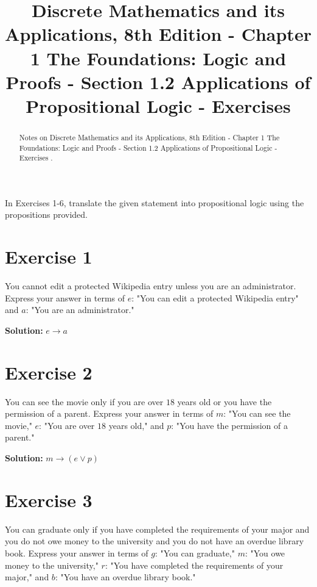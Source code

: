 \documentclass{Axon}
\title{Discrete Mathematics and its Applications, 8th Edition - Chapter 1 The Foundations: Logic and Proofs - Section 1.2 Applications of Propositional Logic - Exercises}
\begin{document}
\maketitle
\makeauthor
\begin{abstract}
Notes on Discrete Mathematics and its Applications, 8th Edition - Chapter 1 The Foundations: Logic and Proofs - Section 1.2 Applications of Propositional Logic - Exercises \cite{Rosen}.
\end{abstract}
\section*{}
In Exercises 1-6, translate the given statement into propositional logic using the propositions provided.

\section*{Exercise 1}
You cannot edit a protected Wikipedia entry unless you are an administrator. Express your answer in terms of \(e\): "You can edit a protected Wikipedia entry" and \(a\): "You are an administrator."

\noindent
\textbf{Solution:}
\(e \to a\)

\section*{Exercise 2}
You can see the movie only if you are over \(18\) years old or you have the permission of a parent. Express your answer in terms of \(m\): "You can see the movie," \(e\): "You are over \(18\) years old," and \(p\): "You have the permission of a parent."

\noindent
\textbf{Solution:}
\(m \to (e \lor p)\)

\section*{Exercise 3}
You can graduate only if you have completed the requirements of your major and you do not owe money to the university and you do not have an overdue library book. Express your answer in terms of \(g\): "You can graduate," \(m\): "You owe money to the university," \(r\): "You have completed the requirements of your major," and \(b\): "You have an overdue library book."
\end{document}

